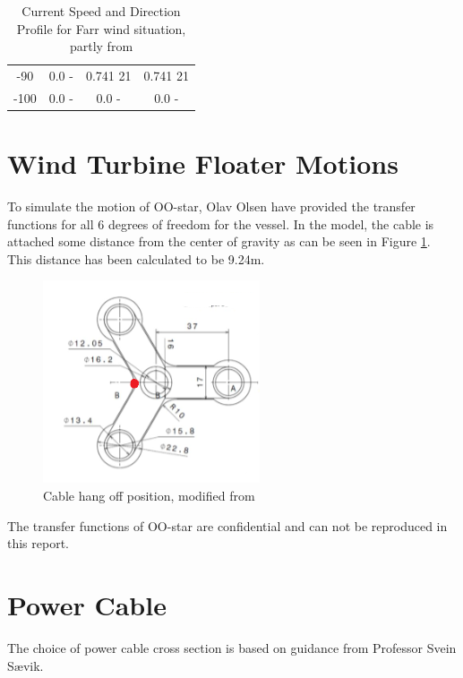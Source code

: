 \begin{table} [H]
\begin{tabular}{ |c|c|c|c|}
 -90 & 0.0 \hspace{0.7cm} - & 0.741 \hspace{0.7cm} 21  & 0.741 \hspace{1.15cm} 21 \\ 
 -100 & 0.0 \hspace{0.7cm} - & 0.0 \hspace{0.7cm} -  & 0.0 \hspace{1.15cm} - \\ 
 \hline
\end{tabular}
\caption{Current Speed and Direction Profile for Farr wind situation, partly from \cite{Lifes50+D1.1}}
\label{table:tidcur}
\end{table}   

\section{Wind Turbine Floater Motions}
To simulate the motion of OO-star, Olav Olsen have provided the transfer functions for all 6 degrees of freedom for the vessel. In the model, the cable is attached some distance from the center of gravity as can be seen in Figure \ref{fig:cabhang}. This distance has been calculated to be 9.24m.

\begin{figure}[H]
\centering
\includegraphics[scale=1.2]{figures/cabhang}
\caption[$\; \:$Cable hang off position]{Cable hang off position, modified from \cite{Lifes50+D4.2}}
 \label{fig:cabhang}
\end{figure}
 \noindent The transfer functions of OO-star are confidential and can not be reproduced in this report. 
 
\section{Power Cable}
The choice of power cable cross section is based on guidance from Professor Svein Sævik. 

